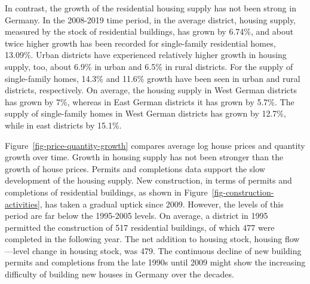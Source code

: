 \documentclass[
  12pt,
]{article}
\begin{document}
In contrast, the growth of the residential housing supply has not been
strong in Germany. In the 2008-2019 time period, in the average
district, housing supply, measured by the stock of residential
buildings, has grown by 6.74\%, and about twice higher growth has been
recorded for single-family residential homes, 13.09\%. Urban districts
have experienced relatively higher growth in housing supply, too, about
6.9\% in urban and 6.5\% in rural districts. For the supply of
single-family homes, 14.3\% and 11.6\% growth have been seen in urban
and rural districts, respectively. On average, the housing supply in
West German districts has grown by 7\%, whereas in East German districts
it has grown by 5.7\%. The supply of single-family homes in West German
districts has grown by 12.7\%, while in east districts by 15.1\%.

Figure~\ref{fig-price-quantity-growth} compares average log house prices
and quantity growth over time. Growth in housing supply has not been
stronger than the growth of house prices. Permits and completions data
support the slow development of the housing supply. New construction, in
terms of permits and completions of residential buildings, as shown in
Figure~\ref{fig-construction-activities}, has taken a gradual uptick
since 2009. However, the levels of this period are far below the
1995-2005 levels. On average, a district in 1995 permitted the
construction of 517 residential buildings, of which 477 were completed
in the following year. The net addition to housing stock, housing
flow---level change in housing stock, was 479. The continuous decline of
new building permits and completions from the late 1990s until 2009
might show the increasing difficulty of building new houses in Germany
over the decades.
\end{document}
